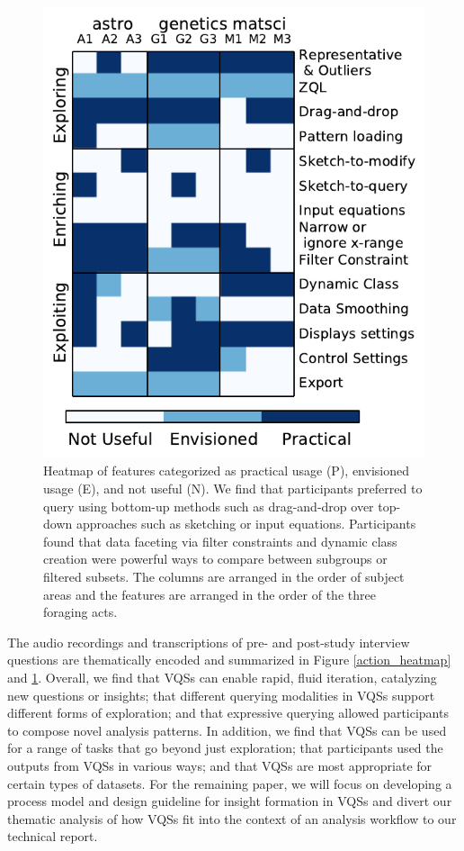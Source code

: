 \begin{figure}[ht!]
    \centering
    \includegraphics[width=0.7\columnwidth]{figures/result2.pdf}
    \vspace{-6pt}\caption{Heatmap of features categorized as practical usage (P), envisioned usage (E), and not useful (N). We find that participants preferred to query using bottom-up methods such as drag-and-drop over top-down approaches such as sketching or input equations. Participants found that data faceting via filter constraints and dynamic class creation were powerful ways to compare between subgroups or filtered subsets. The columns are arranged in the order of subject areas and the features are arranged in the order of the three foraging acts.}
    \label{feature_heatmap}
    \vspace{-5pt}
\end{figure}

\par The audio recordings and transcriptions of pre- and post-study interview questions are thematically encoded and summarized in Figure \ref{action_heatmap} and \ref{feature_heatmap}. Overall, we find that VQSs can enable rapid, fluid iteration, catalyzing new questions or insights; that different querying modalities in VQSs support different forms of exploration; and that expressive querying allowed participants to compose novel analysis patterns. In addition, we find that VQSs can be used for a range of tasks that go beyond just exploration; that participants used the outputs from VQSs in various ways; and that VQSs are most appropriate for certain types of datasets. 
For the remaining paper, we will focus on developing a process model and design guideline for insight formation in VQSs and divert our thematic analysis of how VQSs fit into the context of an analysis workflow to our technical report.
